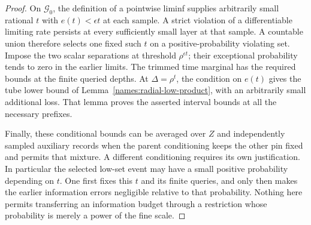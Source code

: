 \begin{proof}
On $\mathcal G_0$, the definition of a pointwise liminf supplies
arbitrarily small rational $t$ with $e(t)<\epsilon t$ at
each sample.  A strict violation of a differentiable limiting
rate persists at every sufficiently small layer at that sample.
A countable union therefore selects one fixed such $t$ on a
positive-probability violating set.  Impose the two scalar
separations at threshold $\rho^{\epsilon t}$; their exceptional
probability tends to zero in the earlier limits.  The trimmed
time marginal has the required bounds at the finite queried
depths.  At $\Delta=\rho^t$, the condition on $e(t)$ gives
the tube lower bound of
Lemma~\ref{names:radial-low-product}, with an arbitrarily
small additional loss.  That lemma proves the asserted
interval bounds at all the necessary prefixes.

Finally, these conditional bounds can be averaged over $Z$
and independently sampled auxiliary records when the parent
conditioning keeps the other pin fixed and permits that
mixture.  A different conditioning requires its own
justification.  In particular the selected low-set event
may have a small positive probability depending on $t$.
One first fixes this $t$ and its finite queries, and only
then makes the earlier information errors negligible relative
to that probability.  Nothing here permits transferring an
information budget through a restriction whose probability
is merely a power of the fine scale.
\end{proof}
